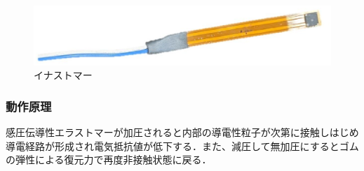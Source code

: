 \begin{figure}[b]
 \begin{center}
  \includegraphics[scale=0.4]{../fig/eps/ina.eps}
 \caption{イナストマー}
  \label{fig::ina}
 \end{center}
\end{figure}

\subsubsection{動作原理}
感圧伝導性エラストマーが加圧されると内部の導電性粒子が次第に接触しはじめ導電経路が形成され電気抵抗値が低下する．また、減圧して無加圧にするとゴムの弾性による復元力で再度非接触状態に戻る．

	

\newpage